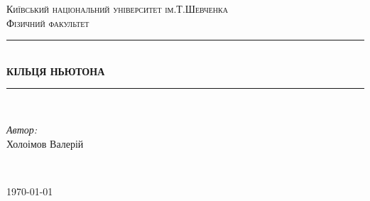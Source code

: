 \center
\newcommand{\HRule}{\rule{\linewidth}{0.3 mm}} %
\textsc{\Large Київський національний університет ім.Т.Шевченка }\\[1.5cm] %
\textsc{\Large Фізичний факультет}\\[2.5cm] %


\HRule \\[0.4cm]
{ \huge \bfseries КІЛЬЦЯ НЬЮТОНА
}\\[0.4cm] %
\HRule \\[1.5cm]

\flushright
\begin{minipage}{0.4\textwidth}
\large
\emph{Автор:}\\ Холоімов Валерій %
\end{minipage}\\[12cm]
\center

{\large \today}\\[0cm] %
\flushleft
